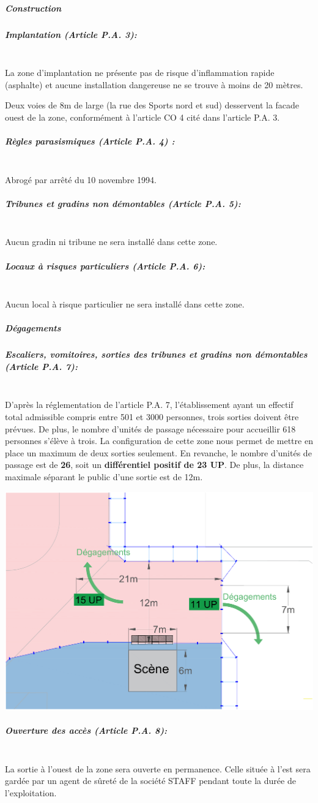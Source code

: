 \documentclass[hidelinks, paper=a4, fontsize=13pt]{report}
\begin{document}
\subparagraph{Construction}

\subparagraph*{Implantation (Article P.A. 3):}\mbox{}\\
La zone d’implantation ne présente pas de risque d’inflammation rapide (asphalte) et aucune installation dangereuse ne se trouve à moins de 20 mètres.

Deux voies de 8m de large (la rue des Sports nord et sud) desservent la facade ouest de la zone, conformément à l'article CO 4 cité dans l'article P.A. 3.

\subparagraph*{Règles parasismiques (Article P.A. 4) :}\mbox{}\\
Abrogé par arrêté du 10 novembre 1994.

\subparagraph*{Tribunes et gradins non démontables (Article P.A. 5):}\mbox{}\\
Aucun gradin ni tribune ne sera installé dans cette zone.

\subparagraph*{Locaux à risques particuliers (Article P.A. 6):}\mbox{}\\
Aucun local à risque particulier ne sera installé dans cette zone.

\subparagraph{Dégagements}

\subparagraph*{Escaliers, vomitoires, sorties des tribunes et gradins non démontables (Article P.A. 7):}\mbox{}\\
D’après la réglementation de l’article P.A. 7, l’établissement ayant un effectif total admissible compris entre 501 et 3000 personnes, trois sorties doivent être prévues. De plus, le nombre d'unités de passage nécessaire pour accueillir 618 personnes s'élève à trois.
La configuration de cette zone nous permet de mettre en place un maximum de deux sorties seulement. En revanche, le nombre d'unités de passage est de \textbf{26}, soit un \textbf{différentiel positif de 23 UP}. De plus, la distance maximale séparant le public d'une sortie est de 12m.

\begin{center}
	\includegraphics[width=.8\textwidth,keepaspectratio]{Exports/Plan_24h_44eme-3e_Scene_Cotes}
\end{center}
\subparagraph*{Ouverture des accès (Article P.A. 8):}\mbox{}\\
La sortie à l'ouest de la zone sera ouverte en permanence. Celle située à l'est sera gardée par un agent de sûreté de la société STAFF pendant toute la durée de l'exploitation.
\end{document}
